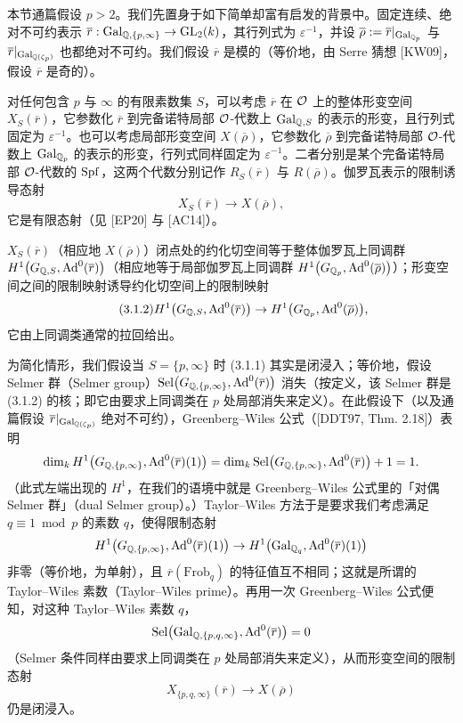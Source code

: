 本节通篇假设 $p>2$。我们先置身于如下简单却富有启发的背景中。固定连续、绝对不可约表示 $\overline{r}:\mathrm{Gal}_{\mathbb{Q},\{p,\infty\}}\to\mathrm{GL}_2(k)$，其行列式为 $\varepsilon^{-1}$，并设 $\overline{\rho}:=\overline{r}|_{\mathrm{Gal}_{\mathbb{Q}_p}}$ 与 $\overline{r}|_{\mathrm{Gal}_{\mathbb{Q}(\zeta_p)}}$ 也都绝对不可约。我们假设 $\overline{r}$ 是模的（等价地，由 Serre 猜想 [KW09]，假设 $\overline{r}$ 是奇的）。

对任何包含 $p$ 与 $\infty$ 的有限素数集 $S$，可以考虑 $\overline{r}$ 在 $\mathcal{O}$ 上的整体形变空间 $X_S(\overline{r})$，它参数化 $\overline{r}$ 到完备诺特局部 $\mathcal{O}$-代数上 $\mathrm{Gal}_{\mathbb{Q},S}$ 的表示的形变，且行列式固定为 $\varepsilon^{-1}$。也可以考虑局部形变空间 $X(\overline{\rho})$，它参数化 $\overline{\rho}$ 到完备诺特局部 $\mathcal{O}$-代数上 $\mathrm{Gal}_{\mathbb{Q}_p}$ 的表示的形变，行列式同样固定为 $\varepsilon^{-1}$。二者分别是某个完备诺特局部 $\mathcal{O}$-代数的 $\operatorname{Spf}$，这两个代数分别记作 $R_S(\overline{r})$ 与 $R(\overline{\rho})$。伽罗瓦表示的限制诱导态射
\begin{equation}
\tag{3.1.1}
X_S(\overline{r})\to X(\overline{\rho}),
\end{equation}
它是有限态射（见 [EP20] 与 [AC14]）。

$X_S(\overline{r})$（相应地 $X(\overline{\rho})$）闭点处的约化切空间等于整体伽罗瓦上同调群 $H^1\bigl(G_{\mathbb{Q},S},\mathrm{Ad}^0(\overline{r})\bigr)$（相应地等于局部伽罗瓦上同调群 $H^1\bigl(G_{\mathbb{Q}_p},\mathrm{Ad}^0(\overline{\rho})\bigr)$）；形变空间之间的限制映射诱导约化切空间上的限制映射
\begin{equation}
\tag{3.1.2}
H^1\bigl(G_{\mathbb{Q},S},\mathrm{Ad}^0(\overline{r})\bigr)\to H^1\bigl(G_{\mathbb{Q}_p},\mathrm{Ad}^0(\overline{\rho})\bigr),
\end{equation}
它由上同调类通常的拉回给出。

为简化情形，我们假设当 $S=\{p,\infty\}$ 时 (3.1.1) 其实是闭浸入；等价地，假设 Selmer 群（Selmer group）$\mathrm{Sel}\bigl(G_{\mathbb{Q},\{p,\infty\}},\mathrm{Ad}^0(\overline{r})\bigr)$ 消失（按定义，该 Selmer 群是 (3.1.2) 的核；即它由要求上同调类在 $p$ 处局部消失来定义）。在此假设下（以及通篇假设 $\overline{r}|_{\mathrm{Gal}_{\mathbb{Q}(\zeta_p)}}$ 绝对不可约），Greenberg--Wiles 公式（[DDT97, Thm. 2.18]）表明
\[
\dim_k H^1\bigl(G_{\mathbb{Q},\{p,\infty\}},\mathrm{Ad}^0(\overline{r})(1)\bigr)=\dim_k \mathrm{Sel}\bigl(G_{\mathbb{Q},\{p,\infty\}},\mathrm{Ad}^0(\overline{r})\bigr)+1=1.
\]
（此式左端出现的 $H^1$，在我们的语境中就是 Greenberg--Wiles 公式里的「对偶 Selmer 群」（dual Selmer group）。）Taylor--Wiles 方法于是要求我们考虑满足 $q\equiv1\bmod p$ 的素数 $q$，使得限制态射
\[
H^1\bigl(G_{\mathbb{Q},\{p,\infty\}},\mathrm{Ad}^0(\overline{r})(1)\bigr)\to H^1\bigl(\mathrm{Gal}_{\mathbb{Q}_q},\mathrm{Ad}^0(\overline{r})(1)\bigr)
\]
非零（等价地，为单射），且 $\overline{r}(\mathrm{Frob}_q)$ 的特征值互不相同；这就是所谓的 Taylor--Wiles 素数（Taylor--Wiles prime）。再用一次 Greenberg--Wiles 公式便知，对这种 Taylor--Wiles 素数 $q$，
\[
\mathrm{Sel}\bigl(\mathrm{Gal}_{\mathbb{Q},\{p,q,\infty\}},\mathrm{Ad}^0(\overline{r})\bigr)=0
\]
（Selmer 条件同样由要求上同调类在 $p$ 处局部消失来定义），从而形变空间的限制态射
\begin{equation}
\tag{3.1.3}
X_{\{p,q,\infty\}}(\overline{r})\to X(\overline{\rho})
\end{equation}
仍是闭浸入。

